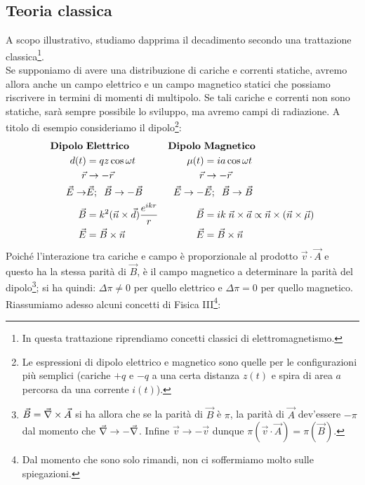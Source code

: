 \subsection{Teoria classica} A scopo illustrativo, studiamo dapprima il decadimento secondo una trattazione classica\footnote{In questa trattazione riprendiamo concetti classici di elettromagnetismo.}.\\
Se supponiamo di avere una distribuzione di cariche e correnti statiche, avremo allora anche un campo elettrico e un campo magnetico statici che possiamo riscrivere in termini di momenti di multipolo. Se tali cariche e correnti non sono statiche, sarà sempre possibile lo sviluppo, ma avremo campi di radiazione. A titolo di esempio consideriamo il dipolo\footnote{Le espressioni di dipolo elettrico e magnetico sono quelle per le configurazioni più semplici (cariche $+q$ e $-q$ a una certa distanza $z(t)$ e spira di area $a$ percorsa da una corrente $i(t)$).}:
\begin{displaymath}
\begin{aligned}
\text{\textbf{Dipolo} }&\text{\textbf{Elettrico}}\index{dipolo!elettrico} & \text{\textbf{Dipolo} }&\text{\textbf{Magnetico}}\index{dipolo!magnetico} \\
d(t) &= qz \cos{\omega t} & \mu(t)&= i a \cos{\omega t} \\
\vec{r}&\to-\vec{r} & \vec{r}&\to-\vec{r} \\
 \vec{E}\to&\vec{E};\;\; \vec{B}\to-\vec{B}\quad & \vec{E}\to-&\vec{E}; \;\; \vec{B}\to\vec{B} \\
\vec{B} &= k^2 (\vec{n}\times \vec{d}) \frac{e^{ikr}}{r} & \vec{B}&= ik\; \vec{n}\times \vec{a} \propto \vec{n} \times (\vec{n}\times \vec{\mu}) \\
\vec{E} &= \vec{B}\times \vec{n} & \vec{E} &= \vec{B}\times \vec{n} 
\end{aligned}
\end{displaymath}
Poiché l'interazione tra cariche e campo è proporzionale al prodotto $\vec{v}\cdot\vec{A}$ e questo ha la stessa parità di $\vec{B}$, è il campo magnetico a determinare la parità del dipolo\footnote{$\vec{B} = \vec{\nabla}\times\vec{A}$ si ha allora che se la parità di $\vec{B}$ è $\pi$, la parità di $\vec{A}$ dev'essere $-\pi$ dal momento che $\vec{\nabla} \to -\vec{\nabla}$. Infine $\vec{v}\to -\vec{v}$ dunque $\pi(\vec{v}\cdot\vec{A}) = \pi(\vec{B})$.}; si ha quindi: $\Delta\pi\not = 0$ per quello elettrico e $\Delta\pi=0$ per quello magnetico.\\
Riassumiamo adesso alcuni concetti di Fisica III\footnote{Dal momento che sono solo rimandi, non ci soffermiamo molto sulle spiegazioni.}:
